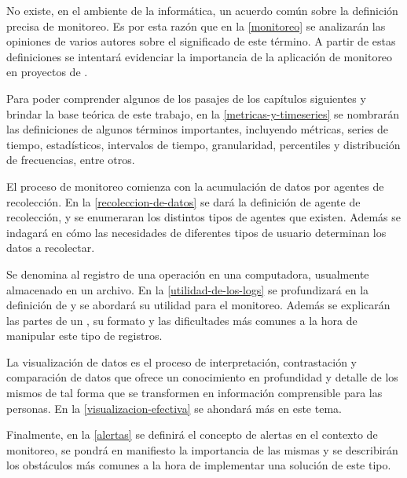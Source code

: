 No existe, en el ambiente de la informática, un acuerdo común sobre la
definición precisa de monitoreo. Es por esta razón que en la \autoref{monitoreo}
se analizarán las opiniones de varios autores sobre el significado
de este término. A partir de estas definiciones se intentará evidenciar la
importancia de la aplicación de monitoreo en proyectos de .

Para poder comprender algunos de los pasajes de los capítulos siguientes y
brindar la base teórica de este trabajo, en la \autoref{metricas-y-timeseries}
se nombrarán las definiciones de algunos términos importantes, incluyendo
métricas, series de tiempo, estadísticos, intervalos de tiempo, granularidad,
percentiles y distribución de frecuencias, entre otros.

El proceso de monitoreo comienza con la acumulación de datos por agentes de
recolección. En la \autoref{recoleccion-de-datos} se dará la definición
de agente de recolección, y se enumeraran los distintos tipos de agentes que
existen. Además se indagará en cómo las necesidades de diferentes tipos de
usuario determinan los datos a recolectar.

Se denomina  al registro de una operación en una computadora,
usualmente almacenado en un archivo. En la \autoref{utilidad-de-los-logs} se
profundizará en la definición de  y se abordará su utilidad para el
monitoreo.  Además se explicarán las partes de un , su formato y las
dificultades más comunes a la hora de manipular este tipo de registros.

La visualización de datos es el proceso de interpretación, contrastación y
comparación de datos que ofrece un conocimiento en profundidad y detalle de
los mismos de tal forma que se transformen en información comprensible para las
personas. En la \autoref{visualizacion-efectiva} se ahondará más en este tema.

Finalmente, en la \autoref{alertas} se definirá el concepto de alertas en el
contexto de monitoreo, se pondrá en manifiesto la importancia de las mismas y
se describirán los obstáculos más comunes a la hora de implementar una solución
de este tipo.
